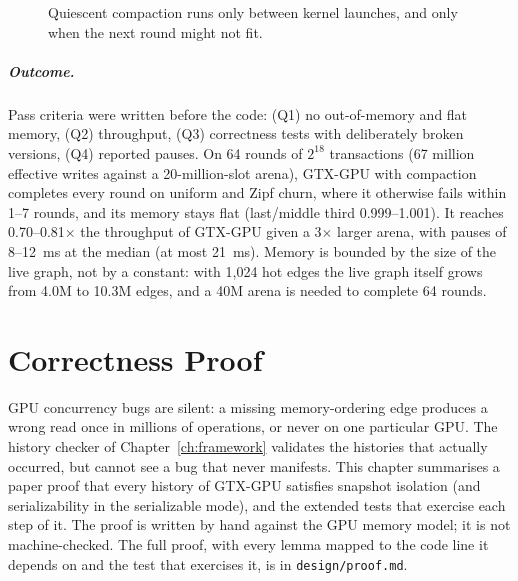 \documentclass[11pt,a4paper,oneside]{report}
\newcommand{\sys}{GTX-GPU}
\newcommand{\code}[1]{\texttt{#1}}
\begin{document}
\begin{figure}[H]
\centering
{}
\caption{Quiescent compaction runs only between kernel launches, and only when the next round might not fit.}
\label{fig:qc}
\end{figure}

\paragraph{Outcome.} Pass criteria were written before the code: (Q1) no out-of-memory and flat memory, (Q2)
throughput, (Q3) correctness tests with deliberately broken versions, (Q4) reported pauses. On 64 rounds of $2^{18}$
transactions (67 million effective writes against a 20-million-slot arena), \sys{} with compaction completes every
round on uniform and Zipf churn, where it otherwise fails within 1--7 rounds, and its memory stays flat (last/middle
third 0.999--1.001). It reaches 0.70--0.81$\times$ the throughput of \sys{} given a 3$\times$ larger arena, with pauses
of 8--12~ms at the median (at most 21~ms). Memory is bounded by the size of the live graph, not by a constant: with
1,024 hot edges the live graph itself grows from 4.0M to 10.3M edges, and a 40M arena is needed to complete 64 rounds.

\chapter{Correctness Proof}
\label{ch:proof}
GPU concurrency bugs are silent: a missing memory-ordering edge produces a wrong read once in millions of operations,
or never on one particular GPU. The history checker of Chapter~\ref{ch:framework} validates the histories that
actually occurred, but cannot see a bug that never manifests. This chapter summarises a paper proof that every history
of \sys{} satisfies snapshot isolation (and serializability in the serializable mode), and the extended tests that
exercise each step of it. The proof is written by hand against the GPU memory model; it is not machine-checked. The
full proof, with every lemma mapped to the code line it depends on and the test that exercises it, is in
\code{design/proof.md}.
\end{document}
